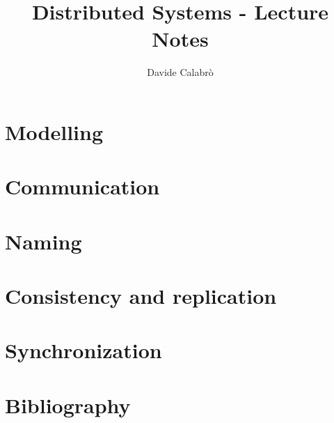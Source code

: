 \documentclass{article}
\title{Distributed Systems - Lecture Notes}
\author{Davide Calabrò}
\begin{document}
    \maketitle
    \newpage
    
    \tableofcontents
    
    \newpage

    \section{Modelling}
    
    
    \newpage
    
    \section{Communication}
    
    
    \newpage
    
    \section{Naming}
    
    
    \newpage
    
    \section{Consistency and replication}
    
    
    \newpage
    
    \section{Synchronization}
    
    
    \newpage
    
    \section{Bibliography}
    
\end{document}
